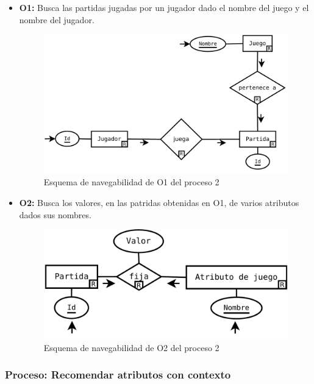 \begin{itemize}
	\item \textbf{O1:} Busca las partidas jugadas por un jugador dado el nombre del juego y
		el nombre del jugador.\\

	\begin{figure}[H]
		\centering
		\includegraphics[width=0.5\linewidth]{../Diagramas/pdf/Consejos/Op2-1.pdf}
		\caption{Esquema de navegabilidad de O1 del proceso 2}
	\end{figure}


	\item \textbf{O2:} Busca los valores, en las patridas obtenidas
		en O1, de varios atributos dados sus nombres.\\

	\begin{figure}[H]
		\centering
		\includegraphics[width=0.5\linewidth]{../Diagramas/pdf/Consejos/Op2-2.pdf}
		\caption{Esquema de navegabilidad de O2 del proceso 2}
	\end{figure}
\end{itemize}



\subsubsection{Proceso: Recomendar atributos con contexto}

